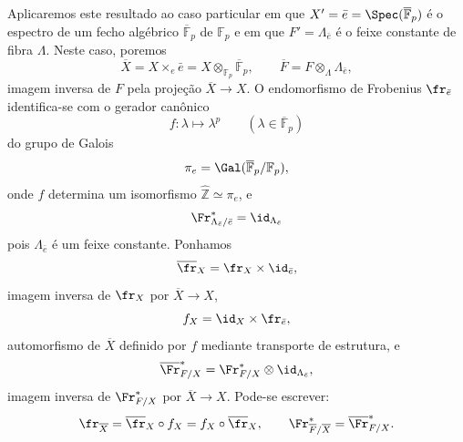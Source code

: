Aplicaremos este resultado ao caso particular em que $X'=\bar e=\Spec(\overline{\mathbb F}_p)$ é o espectro de um fecho algébrico $\overline{\mathbb F}_p$ de $\mathbb F_p$ e em que $F'=\Lambda_{\bar e}$ é o feixe constante de fibra $\Lambda$. Neste caso, poremos
\[
\overline X=X\times_e\bar e=X\otimes_{\mathbb F_p}\overline{\mathbb F}_p,
\qquad
\overline F=F\otimes_\Lambda\Lambda_{\bar e},
\]
imagem inversa de $F$ pela projeção $\overline X\to X$. O endomorfismo de Frobenius $\fr_{\bar e}$ identifica-se com o gerador canônico
\[
f:\lambda\longmapsto\lambda^p\qquad(\lambda\in\overline{\mathbb F}_p)
\]
do grupo de Galois
\[
\pi_e=\Gal(\overline{\mathbb F}_p/\mathbb F_p),
\]
onde $f$ determina um isomorfismo $\widehat{\mathbb Z}\simeq\pi_e$, e
\[
\Fr^*_{\Lambda_{\bar e}/\bar e}=\id_{\Lambda_{\bar e}}
\]
pois $\Lambda_{\bar e}$ é um feixe constante. Ponhamos
\[
\overline{\fr}_X=\fr_X\times\id_{\bar e},
\]
imagem inversa de $\fr_X$ por $\overline X\to X$,
\[
f_X=\id_X\times\fr_{\bar e},
\]
automorfismo de $\overline X$ definido por $f$ mediante transporte de estrutura, e
\[
\overline{\Fr}^*_{F/X}=\Fr^*_{F/X}\otimes\id_{\Lambda_{\bar e}},
\]
imagem inversa de $\Fr^*_{F/X}$ por $\overline X\to X$. Pode-se escrever:
\[
\fr_{\overline X}=\overline{\fr}_X\circ f_X=f_X\circ\overline{\fr}_X,
\qquad
\Fr^*_{\overline F/\overline X}=\overline{\Fr}^*_{F/X}.
\]

